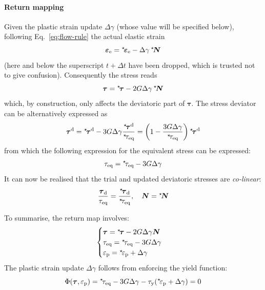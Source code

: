 \documentclass{goose-article}
\newcommand\ST[1]{\hspace*{-.3em}~^\star\!#1}
\newcommand\T[1]{\bm{{#1}}}
\begin{document}
\paragraph{Return mapping}

Given the plastic strain update $\Delta \gamma$ (whose value will be specified below), following Eq.~\eqref{eq:flow-rule} the actual elastic strain
\begin{equation}
  \T{\varepsilon}_\mathrm{e} = \ST{\T{\varepsilon}}_\mathrm{e} - \Delta \gamma \,\ST{\T{N}}
\end{equation}
(here and below the superscript $t + \Delta t$ have been dropped, which is trusted not to give confusion). Consequently the stress reads
\begin{equation}
  \T{\tau} = \ST{\T{\tau}} - 2 G \Delta \gamma \, \ST{\T{N}}
\end{equation}
which, by construction, only affects the deviatoric part of $\T{\tau}$. The stress deviator can be alternatively expressed as
\begin{equation}
  \T{\tau}^\mathrm{d} = \ST{\T{\tau}}^\mathrm{d} - 3 G \Delta \gamma \frac{\ST{\T{\tau}}^\mathrm{d}}{\ST{\tau}_\mathrm{eq}} = \left( 1 - \frac{3 G \Delta \gamma }{\ST{\tau}_\mathrm{eq}} \right) \ST{\T{\tau}}^\mathrm{d}
\end{equation}
from which the following expression for the equivalent stress can be expressed:
\begin{equation}
  \tau_\mathrm{eq} = \ST{\tau}_\mathrm{eq} - 3 G \Delta \gamma
\end{equation}
It can now be realised that the trial and updated deviatoric stresses are \emph{co-linear}:
\begin{equation}
  \frac{ \T{\tau}_\mathrm{d} }{ \tau_\mathrm{eq} }
  =
  \frac{ \ST{\T{\tau}}_\mathrm{d} }{ \ST{\tau}_\mathrm{eq} }, \quad
  \T{N} = \ST{\T{N}}
\end{equation}

To summarise, the return map involves:
\begin{equation}
  \begin{cases}
    \T{\tau} = \ST{\T{\tau}} - 2 G \Delta \gamma \T{N}
    \\
    \tau_\mathrm{eq} = \ST{\tau}_\mathrm{eq} - 3 G \Delta \gamma
    \\
    \varepsilon_\mathrm{p} = \ST{\varepsilon}_\mathrm{p} + \Delta \gamma
  \end{cases}
\end{equation}
The plastic strain update $\Delta \gamma$ follows from enforcing the yield function:
\begin{equation}
  \Phi(\T{\tau}, \varepsilon_\mathrm{p}) = \ST{\tau}_\mathrm{eq} - 3 G \Delta \gamma - \tau_\mathrm{y} ( \ST{\varepsilon}_\mathrm{p} + \Delta \gamma ) = 0
  \label{eq:return-map:yield-function}
\end{equation}
\end{document}
